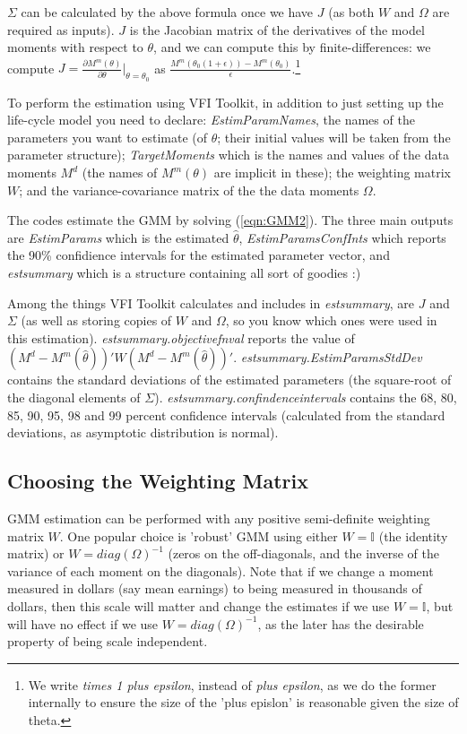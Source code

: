 $\Sigma$ can be calculated by the above formula once we have $J$ (as both $W$ and $\Omega$ are required as inputs). $J$ is the Jacobian matrix of the derivatives of the model moments with respect to $\theta$, and we can compute this by finite-differences: we compute $J=\frac{\partial M^m(\theta)}{\partial \theta}|_{\theta=\theta_0}$ as $\frac{M^m(\theta_0(1+\epsilon))-M^m(\theta_0)}{\epsilon}$.\footnote{We write \textit{times 1 plus epsilon}, instead of \textit{plus epsilon}, as we do the former internally to ensure the size of the 'plus epislon' is reasonable given the size of theta.}

To perform the estimation using VFI Toolkit, in addition to just setting up the life-cycle model you need to declare: \textit{EstimParamNames}, the names of the parameters you want to estimate (of $\theta$; their initial values will be taken from the parameter structure); \textit{TargetMoments} which is the names and values of the data moments $M^d$ (the names of $M^m(\theta)$ are implicit in these); the weighting matrix $W$; and the variance-covariance matrix of the the data moments $\Omega$.

The codes estimate the GMM by solving (\ref{eqn:GMM2}). The three main outputs are \textit{EstimParams} which is the estimated $\hat{\theta}$, \textit{EstimParamsConfInts} which reports the 90\% confidience intervals for the estimated parameter vector, and \textit{estsummary} which is a structure containing all sort of goodies :)

Among the things VFI Toolkit calculates and includes in \textit{estsummary}, are $J$ and $\Sigma$ (as well as storing copies of $W$ and $\Omega$, so you know which ones were used in this estimation). \textit{estsummary.objectivefnval} reports the value of $(M^d-M^m(\hat{\theta}))' W (M^d-M^m(\hat{\theta}))'$. \textit{estsummary.EstimParamsStdDev} contains the standard deviations of the estimated parameters (the square-root of the diagonal elements of $\Sigma$). \textit{estsummary.confindenceintervals} contains the 68, 80, 85, 90, 95, 98 and 99 percent confidence intervals (calculated from the standard deviations, as asymptotic distribution is normal).


\subsection{Choosing the Weighting Matrix}
GMM estimation can be performed with any positive semi-definite weighting matrix $W$. One popular choice is 'robust' GMM using either $W=\mathbb{I}$ (the identity matrix) or $W=diag(\Omega)^{-1}$ (zeros on the off-diagonals, and the inverse of the variance of each moment on the diagonals). Note that if we change a moment measured in dollars (say mean earnings) to being measured in thousands of dollars, then this scale will matter and change the estimates if we use $W=\mathbb{I}$, but will have no effect if we use $W=diag(\Omega)^{-1}$, as the later has the desirable property of being scale independent.

